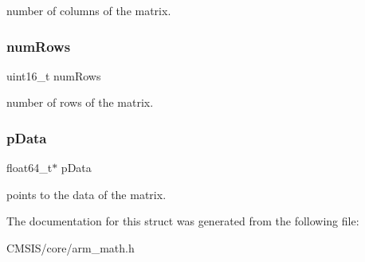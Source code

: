number of columns of the matrix. \mbox{\label{structarm__matrix__instance__f64_a1bcf80ccdc2acc29198f1592ae300390}} 
\subsubsection{\texorpdfstring{num\+Rows}{numRows}}
{\footnotesize\ttfamily uint16\+\_\+t num\+Rows}

number of rows of the matrix. \mbox{\label{structarm__matrix__instance__f64_aa7a4c9839c31e933360ef3a3167b9877}} 
\subsubsection{\texorpdfstring{p\+Data}{pData}}
{\footnotesize\ttfamily float64\+\_\+t$\ast$ p\+Data}

points to the data of the matrix. 

The documentation for this struct was generated from the following file\+:\begin{DoxyCompactItemize}
\item 
C\+M\+S\+I\+S/core/arm\+\_\+math.\+h\end{DoxyCompactItemize}

